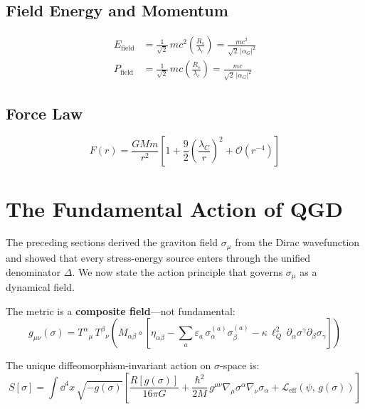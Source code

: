 \documentclass[11pt,a4paper]{article}
\theoremstyle{definition}
\theoremstyle{remark}
\begin{document}
	\subsection{Field Energy and Momentum}
	
	\begin{align}
		E_{\mathrm{field}} &= \frac{1}{\sqrt{2}}\,mc^2\left(\frac{R_s}{\lambda_c}\right) = \frac{mc^2}{\sqrt{2}\,|\alpha_G|^2} \\
		P_{\mathrm{field}} &= \frac{1}{\sqrt{2}}\,mc\left(\frac{R_s}{\lambda_c}\right) = \frac{mc}{\sqrt{2}\,|\alpha_G|^2}
	\end{align}
	
	\subsection{Force Law}
	
	\begin{equation}
		F(r) = \frac{GMm}{r^2}\left[1 + \frac{9}{2}\left(\frac{\lambda_C}{r}\right)^2 + \mathcal{O}(r^{-4})\right]
	\end{equation}
	

	\section{The Fundamental Action of QGD}
	\label{sec:qgd_action}
	
	The preceding sections derived the graviton field $\sigma_\mu$ from the Dirac wavefunction and showed that every stress-energy source enters through the unified denominator $\Delta$.  We now state the action principle that governs $\sigma_\mu$ as a dynamical field.
	
	The metric is a \textbf{composite field}---not fundamental:
	\begin{equation}
		g_{\mu\nu}(\sigma) = T^\alpha{}_\mu\,T^\beta{}_\nu\!\left(M_{\alpha\beta}\circ\left[\eta_{\alpha\beta} - \sum_a\varepsilon_a\,\sigma_\alpha^{(a)}\sigma_\beta^{(a)} - \kappa\,\ell_Q^2\,\partial_\alpha\sigma^\gamma\partial_\beta\sigma_\gamma\right]\right)
		\label{eq:master_metric_preview}
	\end{equation}
	
	The unique diffeomorphism-invariant action on $\sigma$-space is:
	\begin{equation}
		\boxed{S[\sigma] = \int\!\dd^4x\,\sqrt{-g(\sigma)}\left[\frac{R[g(\sigma)]}{16\pi G} + \frac{\hbar^2}{2M}\,g^{\mu\nu}\nabla_\mu\sigma^\alpha\nabla_\nu\sigma_\alpha + \mathcal{L}_{\mathrm{eff}}(\psi,\,g(\sigma))\right]}
		\label{eq:qgd_action}
	\end{equation}
	
\end{document}
